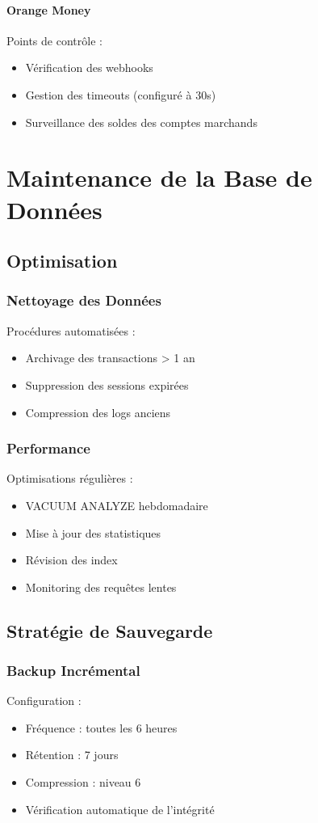 \documentclass[14pt,a4paper]{report}
\begin{document}
\subsubsection{Orange Money}
Points de contrôle :
\begin{itemize}
    \item Vérification des webhooks
    \item Gestion des timeouts (configuré à 30s)
    \item Surveillance des soldes des comptes marchands
\end{itemize}

\chapter{Maintenance de la Base de Données}

\section{Optimisation}
\subsection{Nettoyage des Données}
Procédures automatisées :
\begin{itemize}
    \item Archivage des transactions > 1 an
    \item Suppression des sessions expirées
    \item Compression des logs anciens
\end{itemize}

\subsection{Performance}
Optimisations régulières :
\begin{itemize}
    \item VACUUM ANALYZE hebdomadaire
    \item Mise à jour des statistiques
    \item Révision des index
    \item Monitoring des requêtes lentes
\end{itemize}

\section{Stratégie de Sauvegarde}
\subsection{Backup Incrémental}
Configuration :
\begin{itemize}
    \item Fréquence : toutes les 6 heures
    \item Rétention : 7 jours
    \item Compression : niveau 6
    \item Vérification automatique de l'intégrité
\end{itemize}
\end{document}
